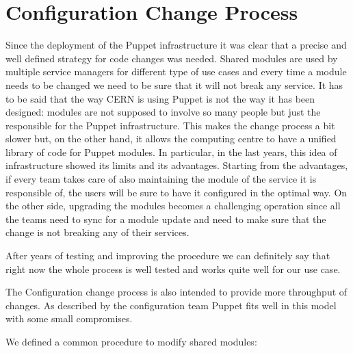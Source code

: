 \section{Configuration Change Process}

Since the deployment of the Puppet infrastructure it was clear that
a precise and well defined strategy for code changes was needed. Shared modules
are used by multiple service managers for different type of use cases and every
time a module needs to be changed we need to be sure that it will not break any
service. It has to be said that the way CERN is using Puppet is not the way it
has been designed: modules are not supposed to involve so many people but just
the responsible for the Puppet infrastructure. This makes the change process
a bit slower but, on the other hand, it allows the computing centre to have
a unified library of code for Puppet modules. In particular, in the last years,
this idea of infrastructure showed its limits and its advantages. Starting from
the advantages, if every team takes care of also maintaining the module of the
service it is responsible of, the users will be sure to have it configured in
the optimal way. On the other side, upgrading the modules becomes a challenging
operation since all the teams need to sync for a module update and need to make
sure that the change is not breaking any of their services.

After years of testing and improving the procedure we can definitely say
that right now the whole process is well tested and works quite well for
our use case.

The Configuration change process is also intended to provide more throughput of
changes. As described by the configuration team \cite{benAgile} Puppet fits
well in this model with some small compromises.

We defined a common procedure to modify shared modules:

